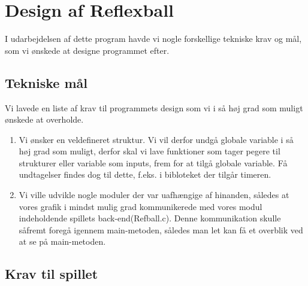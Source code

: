 \section{Design af Reflexball}
I udarbejdelsen af dette program havde vi nogle forskellige tekniske krav og mål, som vi ønskede at designe programmet efter.
\subsection{Tekniske mål}
Vi lavede en liste af krav til programmets design som vi i så høj grad som muligt ønskede at overholde. 
\begin{enumerate}
\item Vi ønsker en veldefineret struktur. Vi vil derfor undgå globale variable i så høj grad som muligt, derfor skal vi lave funktioner som tager pegere til strukturer eller variable som inputs, frem for at tilgå globale variable. Få undtagelser findes dog til dette, f.eks. i bibloteket der tilgår timeren.
\item Vi ville udvikle nogle moduler  der var uafhængige af hinanden, således at vores grafik i mindst mulig grad kommunikerede med vores modul indeholdende spillets back-end(Refball.c). Denne kommunikation skulle såfremt foregå igennem main-metoden, således man let kan få et overblik ved at se på main-metoden.
	
\end{enumerate}


\subsection{Krav til spillet}
